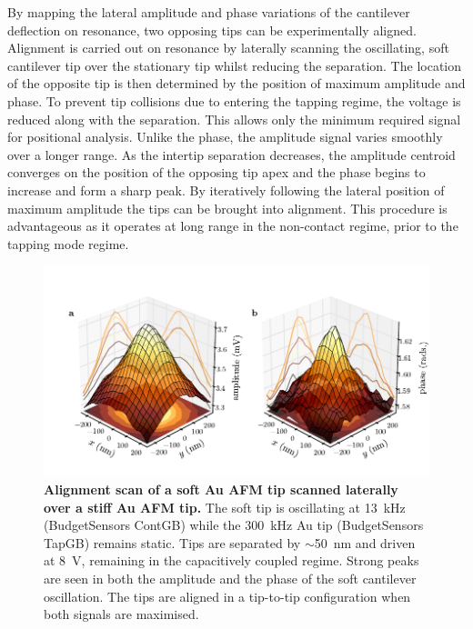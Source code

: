\documentclass{article}
\begin{document}
By mapping the lateral amplitude and phase variations of the cantilever deflection on resonance, two opposing tips can be experimentally aligned. Alignment is carried out on resonance by laterally scanning the oscillating, soft cantilever tip over the stationary tip whilst reducing the separation. The location of the opposite tip is then determined by the position of maximum amplitude and phase. To prevent tip collisions due to entering the tapping regime, the voltage is reduced along with the separation. This allows only the minimum required signal for positional analysis. Unlike the phase, the amplitude signal varies smoothly over a longer range. As the intertip separation decreases, the amplitude centroid converges on the position of the opposing tip apex and the phase begins to increase and form a sharp peak.  By iteratively following the lateral position of maximum amplitude the tips can be brought into alignment. This procedure is advantageous as it operates at long range in the non-contact regime, prior to the tapping mode regime.

\begin{figure}[bt]
\centering
\includegraphics[clip=true, trim=27 19 0 33]{figures/alignment_scan}
\caption[Alignment scan of a soft Au AFM tip scanned laterally over a stiff Au AFM tip]{\textbf{Alignment scan of a soft Au AFM tip scanned laterally over a stiff Au AFM tip.} The soft tip is oscillating at \SI{13}{kHz} (BudgetSensors ContGB) while the \SI{300}{kHz} Au tip (BudgetSensors TapGB) remains static. Tips are separated by $\sim$\SI{50}{nm} and driven at \SI{8}{V}, remaining in the capacitively coupled regime. Strong peaks are seen in both the amplitude and the phase of the soft cantilever oscillation. The tips are aligned in a tip-to-tip configuration when both signals are maximised.}
\label{fig:alignment_scan} 
\end{figure}
\end{document}
